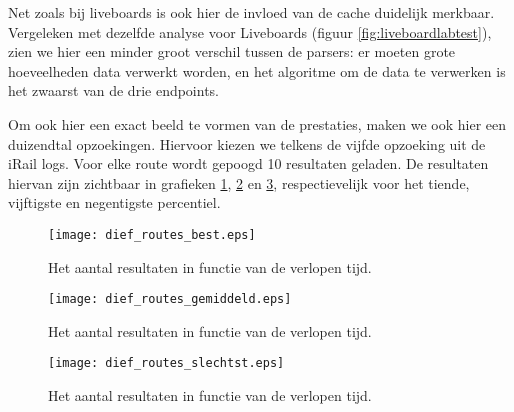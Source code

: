 Net zoals bij liveboards is ook hier de invloed van de cache duidelijk merkbaar. Vergeleken met dezelfde analyse voor Liveboards (figuur \ref{fig:liveboardlabtest}), zien we hier een minder groot verschil tussen de parsers: er moeten grote hoeveelheden data verwerkt worden, en het algoritme om de data te verwerken is het zwaarst van de drie endpoints.

Om ook hier een exact beeld te vormen van de prestaties, maken we ook hier een duizendtal opzoekingen. Hiervoor kiezen we telkens de vijfde opzoeking uit de iRail logs. Voor elke route wordt gepoogd 10 resultaten geladen. De resultaten hiervan zijn zichtbaar in grafieken \ref{fig:routesDiefBest}, \ref{fig:routesDiefAvg} en \ref{fig:routesDiefSlechtst}, respectievelijk voor het tiende, vijftigste en negentigste percentiel.

\begin{figure}[h]
	\centering
	\texttt{[image: dief\_routes\_best.eps]}
	\caption[Aantal resultaten routes in functie van de tijd]{Het aantal resultaten in functie van de verlopen tijd.}
	\label{fig:routesDiefBest}
\end{figure}

\begin{figure}[h]
	\centering
	\texttt{[image: dief\_routes\_gemiddeld.eps]}
	\caption[Aantal resultaten routes in functie van de tijd]{Het aantal resultaten in functie van de verlopen tijd.}
	\label{fig:routesDiefAvg}
\end{figure}

\begin{figure}[h]
	\centering
	\texttt{[image: dief\_routes\_slechtst.eps]}
	\caption[Aantal resultaten routes in functie van de tijd]{Het aantal resultaten in functie van de verlopen tijd.}
	\label{fig:routesDiefSlechtst}
\end{figure}

